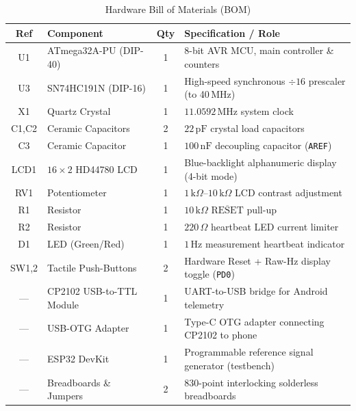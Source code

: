 \documentclass[11pt,a4paper]{article}
\begin{document}
\begin{table}[H]
\centering
\caption{Hardware Bill of Materials (BOM)}
\label{tab:bom}
\renewcommand{\arraystretch}{1.15}
\begin{tabularx}{\textwidth}{c l c X}
\toprule
\textbf{Ref} & \textbf{Component} & \textbf{Qty} & \textbf{Specification / Role} \\
\midrule
U1   & ATmega32A-PU (DIP-40)     & 1 & 8-bit AVR MCU, main controller \& counters \\
U3   & SN74HC191N (DIP-16)       & 1 & High-speed synchronous $\div 16$ prescaler (to 40\,MHz) \\
X1   & Quartz Crystal            & 1 & $11.0592\,\text{MHz}$ system clock \\
C1,C2& Ceramic Capacitors        & 2 & $22\,\text{pF}$ crystal load capacitors \\
C3   & Ceramic Capacitor         & 1 & $100\,\text{nF}$ decoupling capacitor (\texttt{AREF}) \\
LCD1 & $16\times 2$ HD44780 LCD  & 1 & Blue-backlight alphanumeric display (4-bit mode) \\
RV1  & Potentiometer             & 1 & $1\,\text{k}\Omega\text{--}10\,\text{k}\Omega$ LCD contrast adjustment \\
R1   & Resistor                  & 1 & $10\,\text{k}\Omega$ $\overline{\text{RESET}}$ pull-up \\
R2   & Resistor                  & 1 & $220\,\Omega$ heartbeat LED current limiter \\
D1   & LED (Green/Red)           & 1 & $1\,\text{Hz}$ measurement heartbeat indicator \\
SW1,2& Tactile Push-Buttons      & 2 & Hardware Reset + Raw-Hz display toggle (\texttt{PD0}) \\
---  & CP2102 USB-to-TTL Module  & 1 & UART-to-USB bridge for Android telemetry \\
---  & USB-OTG Adapter           & 1 & Type-C OTG adapter connecting CP2102 to phone \\
---  & ESP32 DevKit              & 1 & Programmable reference signal generator (testbench) \\
---  & Breadboards \& Jumpers    & 2 & 830-point interlocking solderless breadboards \\
\bottomrule
\end{tabularx}
\end{table}
\end{document}

